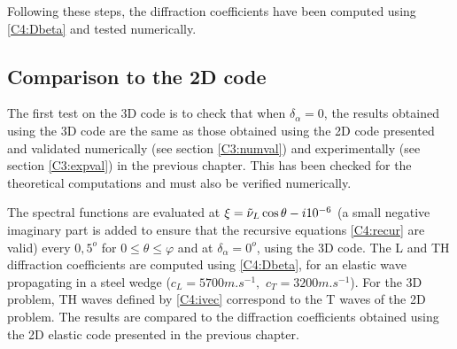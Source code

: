Following these steps, the diffraction coefficients have been computed using \eqref{C4:Dbeta} and tested numerically.

\subsection{Comparison to the 2D code}
The first test on the 3D code is to check that when $\delta_{\alpha}=0$, the results obtained using the 3D code are the same as those obtained using the 2D code presented and validated numerically (see section \ref{C3:numval}) and experimentally (see section \ref{C3:expval}) in the previous chapter. This has been checked for the theoretical computations and must also be verified numerically.

The spectral functions are evaluated at $\xi=\tilde{\nu}_L\cos\theta -i10^{-6}$ (a small negative imaginary part is added to ensure that the recursive equations \eqref{C4:recur} are valid) every $0,5^o$ for $0\leq\theta\leq \varphi$ and at $\delta_{\alpha} =0^o$,  using the 3D code. The L and TH diffraction coefficients are computed using \eqref{C4:Dbeta}, for an elastic wave propagating in a steel wedge ($c_L=5700m.s^{-1}, \, \, c_T=3200m.s^{-1}$). For the 3D problem, TH waves defined by \eqref{C4:ivec} correspond to the T waves of the 2D problem. The results are compared to the diffraction coefficients obtained using the 2D elastic code presented in the previous chapter.

